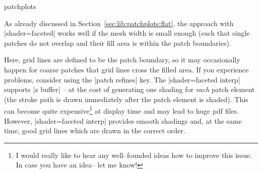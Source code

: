 {\begin{pgfplotslibrary}{patchplots}
\begin{codeexample}[]
\end{codeexample}
\noindent As already discussed in Section~\ref{sec:lib:patchplots:flat}, the approach with |shader=faceted| works well if the mesh width is small enough (such that single patches do not overlap and their fill area is within the patch boundaries).
%
\begin{codeexample}[]
\end{codeexample}
\noindent Here, grid lines are defined to be the patch boundary, so it may occasionally happen for coarse patches that grid lines cross the filled area. If you experience problems, consider using the |patch refines| key. The |shader=faceted interp| supports |z buffer| -- at the cost of generating one shading for \emph{each} patch element (the stroke path is drawn immediately after the patch element is shaded). This can become quite expensive\footnote{I would really like to hear any well--founded ideas how to improve this issue. In case you have an idea-- let me know!} at display time and may lead to huge pdf files. However, |shader=faceted interp| provides smooth shadings and, at the same time, good  grid lines which are drawn in the correct order. 

%
\begin{codeexample}[]
\begin{tikzpicture}
\begin{axis}[
	title={Mesh on top of patches (i): obscured}]


\end{axis}
\end{tikzpicture}
\end{codeexample}
\end{pgfplotslibrary}}
